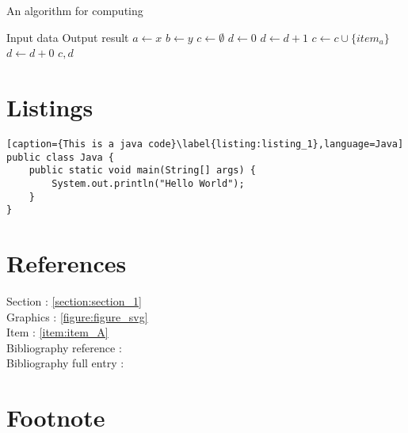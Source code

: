 \begin{algorithm}
\caption{An algorithm for computing} \label{algorithm:algorithm_1}
\begin{algorithmic}[1] %
    \Require Input data
    \Ensure Output result
    \State $a \gets x$
    \State $b \gets y$
    \State $c \gets \emptyset$
        \State $d \gets 0$
                \State $d \gets d + 1$
                \State $c \gets c \cup \{ item_a \} $
            \Else
                \State $d \gets d + 0$
            \EndIf
        \EndFor
    \EndFor
    \State \Return $c,d$
\EndProcedure
\end{algorithmic}
\end{algorithm}


\newpage


\section{Listings}

\begin{lstlisting}[caption={This is a java code}\label{listing:listing_1},language=Java] 
public class Java {
    public static void main(String[] args) {
        System.out.println("Hello World");
    }
}
\end{lstlisting}

\newpage


\section{References}
Section : \ref{section:section_1} \\
Graphics : \ref{figure:figure_svg} \\
Item : \ref{item:item_A} \\
Bibliography reference : \cite{lamport1991latex} \\
Bibliography full entry : 

\newpage


\section{Footnote}

